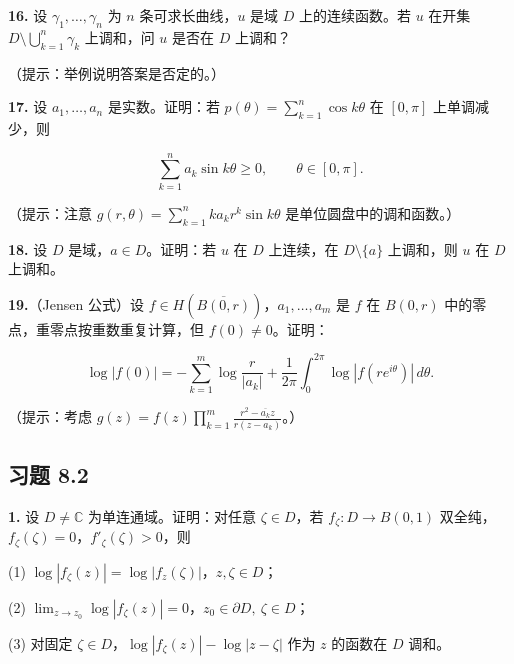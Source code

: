 \documentclass[11pt,a4paper]{article}
\begin{document}
\par{}
\noindent\textbf{16.} 设 \(\gamma_1,\ldots,\gamma_n\) 为 \(n\)
条可求长曲线，\(u\) 是域 \(D\) 上的连续函数。若 \(u\) 在开集
\(D\setminus\bigcup_{k=1}^n\gamma_k\) 上调和，问 \(u\) 是否在 \(D\)
上调和？

（提示：举例说明答案是否定的。）

\par{}
\noindent\textbf{17.} 设 \(a_1,\ldots,a_n\) 是实数。证明：若
\(p(\theta)=\sum_{k=1}^n\cos k\theta\) 在 \([0,\pi]\) 上单调减少，则

\[
\sum_{k=1}^na_k\sin k\theta\ge0,\qquad\theta\in[0,\pi].
\]

（提示：注意 \(g(r,\theta)=\sum_{k=1}^nka_kr^k\sin k\theta\)
是单位圆盘中的调和函数。）

\par{}
\noindent\textbf{18.} 设 \(D\) 是域，\(a\in D\)。证明：若 \(u\) 在 \(D\)
上连续，在 \(D\setminus\{a\}\) 上调和，则 \(u\) 在 \(D\) 上调和。

\par{}
\noindent\textbf{19.}（Jensen 公式）设
\(f\in H(\overline{B(0,r)})\)，\(a_1,\ldots,a_m\) 是 \(f\) 在 \(B(0,r)\)
中的零点，重零点按重数重复计算，但 \(f(0)\ne0\)。证明：

\[
\log|f(0)|=-\sum_{k=1}^m\log\frac r{|a_k|}
+\frac1{2\pi}\int_0^{2\pi}\log|f(re^{i\theta})|\,d\theta.
\]

（提示：考虑
\(\displaystyle g(z)=f(z)\prod_{k=1}^m\frac{r^2-\overline{a_k}z}{r(z-a_k)}\)。）

\subsection{习题 8.2}\label{ch08-practice-heading-3}

\par{}
\noindent\textbf{1.} 设 \(D\ne\mathbb C\) 为单连通域。证明：对任意
\(\zeta\in D\)，若 \(f_\zeta:D\to B(0,1)\)
双全纯，\(f_\zeta(\zeta)=0\)，\(f'_\zeta(\zeta)>0\)，则

(1) \(\log|f_\zeta(z)|=\log|f_z(\zeta)|\)，\(z,\zeta\in D\)；

(2)
\(\displaystyle\lim_{z\to z_0}\log|f_\zeta(z)|=0\)，\(z_0\in\partial D,\ \zeta\in D\)；

(3) 对固定 \(\zeta\in D\)，\(\log|f_\zeta(z)|-\log|z-\zeta|\) 作为 \(z\)
的函数在 \(D\) 调和。
\end{document}
